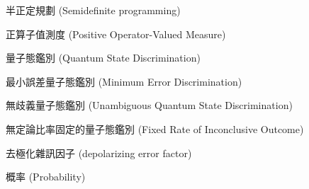 
\begin{denotation}[3cm]

\item[SDP]{
  半正定規劃 (Semidefinite programming)
}

\item[POVM]{
  正算子值測度 (Positive Operator-Valued Measure)
}

\item[QSD]{
  量子態鑑別 (Quantum State Discrimination)
}

\item[MED]{
  最小誤差量子態鑑別 (Minimum Error Discrimination)
}

\item[UQSD]{
  無歧義量子態鑑別 (Unambiguous Quantum State Discrimination)
}

\item[FRIO]{
  無定論比率固定的量子態鑑別 (Fixed Rate of Inconclusive Outcome)
}

\item[$\lambda$]{
  去極化雜訊因子 (depolarizing error factor)
}

\item[$P$]{
  概率 (Probability)
}

\end{denotation}
